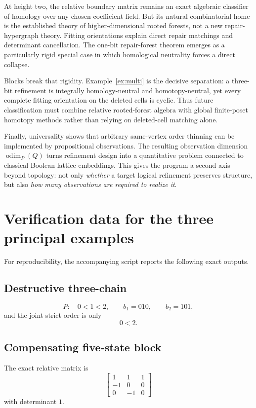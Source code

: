 \documentclass[11pt]{article}
\theoremstyle{definition}
\newcommand{\odim}{\operatorname{odim}}
\begin{document}
At height two, the relative boundary matrix remains an exact algebraic classifier of homology over any chosen coefficient field. But its natural combinatorial home is the established theory of higher-dimensional rooted forests, not a new repair-hypergraph theory. Fitting orientations explain direct repair matchings and determinant cancellation. The one-bit repair-forest theorem emerges as a particularly rigid special case in which homological neutrality forces a direct collapse.

Blocks break that rigidity. Example~\ref{ex:multi} is the decisive separation: a three-bit refinement is integrally homology-neutral and homotopy-neutral, yet every complete fitting orientation on the deleted cells is cyclic. Thus future classification must combine relative rooted-forest algebra with global finite-poset homotopy methods rather than relying on deleted-cell matching alone.

Finally, universality shows that arbitrary same-vertex order thinning can be implemented by propositional observations. The resulting observation dimension $\odim_P(Q)$ turns refinement design into a quantitative problem connected to classical Boolean-lattice embeddings. This gives the program a second axis beyond topology: not only \emph{whether} a target logical refinement preserves structure, but also \emph{how many observations are required to realize it}.

\appendix
\section{Verification data for the three principal examples}

For reproducibility, the accompanying script reports the following exact outputs.

\subsection*{Destructive three-chain}
\[
P:\quad 0<1<2,
\qquad b_1=010,
\qquad b_2=101,
\]
and the joint strict order is only
\[
0<2.
\]

\subsection*{Compensating five-state block}
The exact relative matrix is
\[
\begin{bmatrix}
1&1&1\\
-1&0&0\\
0&-1&0
\end{bmatrix}
\]
with determinant $1$.
\end{document}
